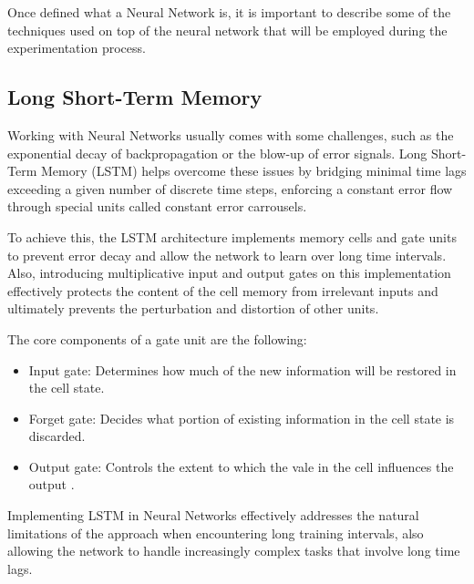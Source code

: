 Once defined what a Neural Network is, it is important to describe some of the techniques used on top of the neural network that will be employed during the experimentation process.

\subsection{Long Short-Term Memory}

Working with Neural Networks usually comes with some challenges, such as the exponential decay of backpropagation or the blow-up of error signals. Long Short-Term Memory (LSTM) helps overcome these issues by bridging minimal time lags exceeding a given number of discrete time steps, enforcing a constant error flow through special units called constant error carrousels.

To achieve this, the LSTM architecture implements memory cells and gate units to prevent error decay and allow the network to learn over long time intervals. Also, introducing multiplicative input and output gates on this implementation effectively protects the content of the cell memory from irrelevant inputs and ultimately prevents the perturbation and distortion of other units.

The core components of a gate unit are the following:

\begin{itemize}
    \item Input gate: Determines how much of the new information will be restored in the cell state.
    \item Forget gate: Decides what portion of existing information in the cell state is discarded.
    \item Output gate: Controls the extent to which the vale in the cell influences the output \cite{hochreiter1997}.
\end{itemize}

Implementing LSTM in Neural Networks effectively addresses the natural limitations of the approach when encountering long training intervals, also allowing the network to handle increasingly complex tasks that involve long time lags.
